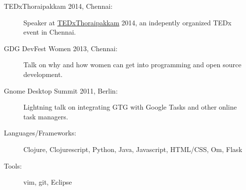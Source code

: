 \documentclass[letterpaper]{article}
\begin{document}
\begin{description}
    \item[\hspace{12pt}TEDxThoraipakkam 2014, Chennai:] \small{Speaker at \href{http://tedxtpkm.com}{TEDxThoraipakkam} 2014, an indepently organized TEDx event in Chennai.}\normalsize\vspace{-6pt}
    \item[\hspace{12pt}GDG DevFest Women 2013, Chennai:] \small{Talk on why and how women can get into programming and open source development.}\normalsize\vspace{-6pt}
    \item[\hspace{12pt}Gnome Desktop Summit 2011, Berlin:] \small{Lightning talk on integrating GTG with Google Tasks and other online task managers.}\normalsize
    
\end{description}

\begin{description}
    \item[\hspace{12pt}Languages/Frameworks:] \small{Clojure, Clojurescript, Python, Java, Javascript, HTML/CSS, Om, Flask}\normalsize\vspace{-6pt}
    \item[\hspace{12pt}Tools:] \small{vim, git, Eclipse}\normalsize
\end{description}
\end{document}
